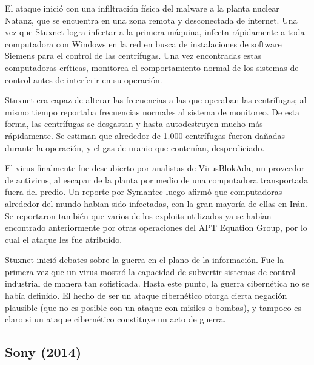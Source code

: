 \documentclass{article}
\begin{document}
El ataque inició con una infiltración física del malware a la planta nuclear Natanz, que se encuentra en una zona remota y desconectada de internet. Una vez que Stuxnet logra infectar a la primera máquina, infecta rápidamente a toda computadora con Windows en la red en busca de instalaciones de software Siemens para el control de las centrífugas. Una vez encontradas estas computadoras críticas, monitorea el comportamiento normal de los sistemas de control antes de interferir en su operación.

Stuxnet era capaz de alterar las frecuencias a las que operaban las centrífugas; al mismo tiempo reportaba frecuencias normales al sistema de monitoreo. De esta forma, las centrífugas se desgastan y hasta autodestruyen mucho más rápidamente. Se estiman que alrededor de 1.000 centrífugas fueron dañadas durante la operación, y el gas de uranio que contenían, desperdiciado. \autocite{zetter-stuxnet} \autocite{washingtonpost-stuxnet}

El virus finalmente fue descubierto por analistas de VirusBlokAda, un proveedor de antivirus, al escapar de la planta por medio de una computadora transportada fuera del predio. Un reporte por Symantec luego afirmó que computadoras alrededor del mundo habian sido infectadas, con la gran mayoría de ellas en Irán. Se reportaron también que varios de los exploits utilizados ya se habían encontrado anteriormente por otras operaciones del APT Equation Group, por lo cual el ataque les fue atribuído. \autocite{infoworld-stuxnet} 

Stuxnet inició debates sobre la guerra en el plano de la información. Fue la primera vez que un virus mostró la capacidad de subvertir sistemas de control industrial de manera tan sofisticada. Hasta este punto, la guerra cibernética no se había definido. El hecho de ser un ataque cibernético otorga cierta negación plausible (que no es posible con un ataque con misiles o bombas), y tampoco es claro si un ataque cibernético constituye un acto de guerra. \autocite{washingtonpost-stuxnet-2} \autocite{darknetdiaries-stuxnet}


\subsection{Sony (2014)}
\end{document}
